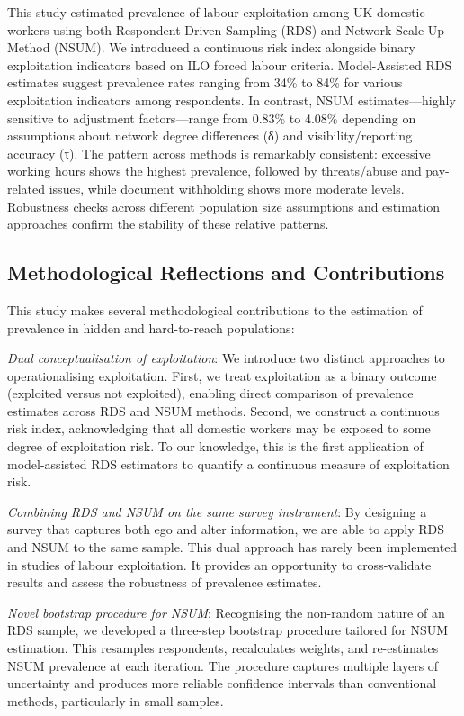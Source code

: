 \documentclass[
  12pt,
  letterpaper,
  DIV=11,
  numbers=noendperiod]{scrartcl}
\theoremstyle{plain}
\theoremstyle{definition}
\begin{document}
This study estimated prevalence of labour exploitation among UK domestic
workers using both Respondent-Driven Sampling (RDS) and Network Scale-Up
Method (NSUM). We introduced a continuous risk index alongside binary
exploitation indicators based on ILO forced labour criteria.
Model-Assisted RDS estimates suggest prevalence rates ranging from 34\%
to 84\% for various exploitation indicators among respondents. In
contrast, NSUM estimates---highly sensitive to adjustment
factors---range from 0.83\% to 4.08\% depending on assumptions about
network degree differences (δ) and visibility/reporting accuracy (τ).
The pattern across methods is remarkably consistent: excessive working
hours shows the highest prevalence, followed by threats/abuse and
pay-related issues, while document withholding shows more moderate
levels. Robustness checks across different population size assumptions
and estimation approaches confirm the stability of these relative
patterns.

\subsection{Methodological Reflections and
Contributions}\label{methodological-reflections-and-contributions}

This study makes several methodological contributions to the estimation
of prevalence in hidden and hard-to-reach populations:

\emph{Dual conceptualisation of exploitation}: We introduce two distinct
approaches to operationalising exploitation. First, we treat
exploitation as a binary outcome (exploited versus not exploited),
enabling direct comparison of prevalence estimates across RDS and NSUM
methods. Second, we construct a continuous risk index, acknowledging
that all domestic workers may be exposed to some degree of exploitation
risk. To our knowledge, this is the first application of model-assisted
RDS estimators to quantify a continuous measure of exploitation risk.

\emph{Combining RDS and NSUM on the same survey instrument}: By
designing a survey that captures both ego and alter information, we are
able to apply RDS and NSUM to the same sample. This dual approach has
rarely been implemented in studies of labour exploitation. It provides
an opportunity to cross-validate results and assess the robustness of
prevalence estimates.

\emph{Novel bootstrap procedure for NSUM}: Recognising the non-random
nature of an RDS sample, we developed a three-step bootstrap procedure
tailored for NSUM estimation. This resamples respondents, recalculates
weights, and re-estimates NSUM prevalence at each iteration. The
procedure captures multiple layers of uncertainty and produces more
reliable confidence intervals than conventional methods, particularly in
small samples.
\end{document}
